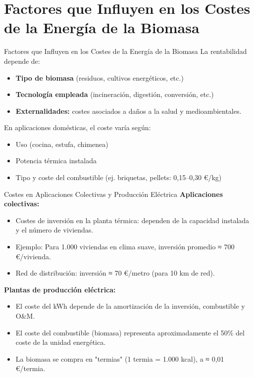 \documentclass[../../main.tex]{subfiles}
\begin{document}
\section{Factores que Influyen en los Costes de la Energía de la Biomasa}
\begin{frame}{Factores que Influyen en los Costes de la Energía de la Biomasa}
\justifying
La rentabilidad depende de:
\begin{itemize}
  \item \textbf{Tipo de biomasa} (residuos, cultivos energéticos, etc.)
  \item \textbf{Tecnología empleada} (incineración, digestión, conversión, etc.)
  \item \textbf{Externalidades:} costes asociados a daños a la salud y medioambientales.
\end{itemize}

\vspace{0.5em}
En aplicaciones domésticas, el coste varía según:
\begin{itemize}
  \item Uso (cocina, estufa, chimenea)
  \item Potencia térmica instalada
  \item Tipo y coste del combustible (ej. briquetas, pellets: 0,15–0,30 €/kg)
\end{itemize}
\end{frame}
\begin{frame}{Costes en Aplicaciones Colectivas y Producción Eléctrica}
\justifying
\textbf{Aplicaciones colectivas:}
\begin{itemize}
  \item Costes de inversión en la planta térmica: dependen de la capacidad instalada y el número de viviendas.
  \item Ejemplo: Para 1.000 viviendas en clima suave, inversión promedio ≈ 700 €/vivienda.
  \item Red de distribución: inversión ≈ 70 €/metro (para 10 km de red).
\end{itemize}

\vspace{0.5em}
\textbf{Plantas de producción eléctrica:}
\begin{itemize}
  \item El coste del kWh depende de la amortización de la inversión, combustible y O\&M.
  \item El coste del combustible (biomasa) representa aproximadamente el 50\% del coste de la unidad energética.
  \item La biomasa se compra en "termias" (1 termia = 1.000 kcal), a ≈ 0,01 €/termia.
\end{itemize}
\end{frame}
\end{document}
